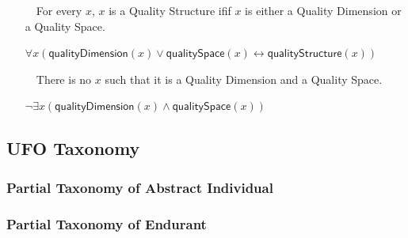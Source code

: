 \documentclass{article}
\newcommand{\BeginAbstractIndividualTaxonomy}{51}
\newcommand{\EndAbstractIndividualTaxonomy}{86}
\newcommand{\AxLabel}{a}
\newcounter{cntax}
\newcommand{\myax}[1]{\refstepcounter{cntax}{\bf \small \AxLabel\thecntax}\label{#1}$\,\,\,\,$}
\newcommand{\me}[1]{\textsf{#1}}
\begin{document}
\begin{itemize}
    \item[\myax{ax_qualityStructure_taxonomy}] For every $x$, $x$ is a \me{Quality Structure} ifif $x$ is either a \me{Quality Dimension} or a \me{Quality Space}.
    
    $\forall x(\textsf{qualityDimension}(x)\vee \textsf{qualitySpace}(x)\leftrightarrow \textsf{qualityStructure}(x))$
    
    
    
    
    \item[\myax{ax_qualityStructure_partition}] There is no $x$ such that it is a \me{Quality Dimension} and a \me{Quality Space}.
    
    $\neg \exists x(\textsf{qualityDimension}(x)\wedge \textsf{qualitySpace}(x))$
    
    
\end{itemize}




\subsection{UFO Taxonomy}

\subsubsection{Partial Taxonomy of Abstract Individual}





\subsubsection{Partial Taxonomy of Endurant}
\end{document}

